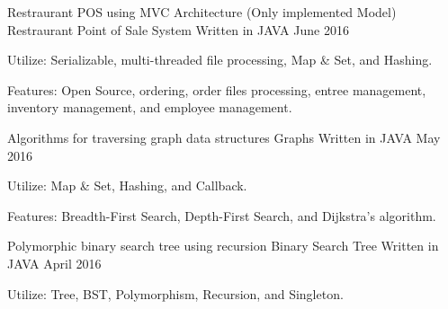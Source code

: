 

\begin{cventries}

  \cventry
    {Restraurant POS using MVC Architecture (Only implemented Model)} %
    {Restraurant Point of Sale System} %
    {Written in JAVA} %
    {June 2016} %
    {
      \begin{cvitems} %
          \item {Utilize: Serializable, multi-threaded file processing, Map \& Set, and Hashing.}
          \item {Features: Open Source, ordering, order files processing, entree management, inventory management, and employee management.}
      \end{cvitems}
    }
    
    \cventry
    {Algorithms for traversing graph data structures} %
    {Graphs} %
    {Written in JAVA} %
    {May 2016} %
    {
      \begin{cvitems} %
          \item {Utilize: Map \& Set, Hashing, and Callback.}
          \item {Features: Breadth-First Search, Depth-First Search, and Dijkstra's algorithm.}
      \end{cvitems}
    }
    
     \cventry
    {Polymorphic binary search tree using recursion} %
    {Binary Search Tree} %
    {Written in JAVA} %
    {April 2016} %
    {
      \begin{cvitems} %
          \item {Utilize: Tree, BST, Polymorphism, Recursion, and Singleton.}
      \end{cvitems}
    }

\end{cventries}
